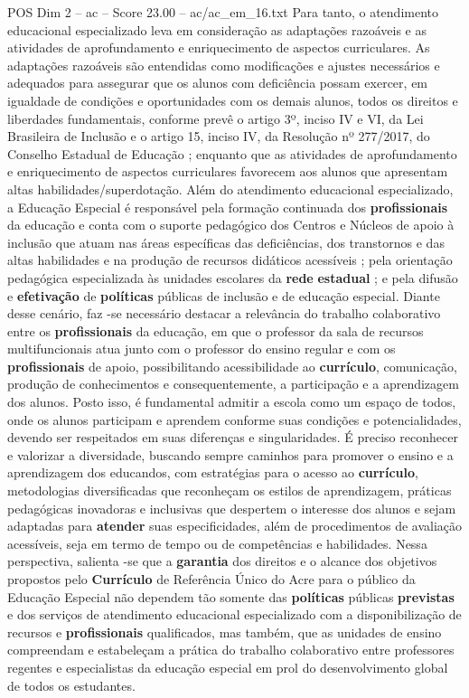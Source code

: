 \begin{textsample}{POS Dim 2 – ac – Score 23.00 – ac/ac\_em\_16.txt}
Para tanto, o atendimento educacional especializado leva em consideração as adaptações razoáveis e as atividades de aprofundamento e enriquecimento de aspectos curriculares.
As adaptações razoáveis são entendidas como modificações e ajustes necessários e adequados para assegurar que os alunos com deficiência possam exercer, em igualdade de condições e oportunidades com os demais alunos, todos os direitos e liberdades fundamentais, conforme prevê o artigo 3º, inciso IV e VI, da Lei Brasileira de Inclusão e o artigo 15, inciso IV, da Resolução nº 277/2017, do Conselho Estadual de Educação ; enquanto que as atividades de aprofundamento e enriquecimento de aspectos curriculares favorecem aos alunos que apresentam altas habilidades/superdotação.
Além do atendimento educacional especializado, a Educação Especial é responsável pela formação continuada dos \textbf{profissionais} da educação e conta com o suporte pedagógico dos Centros e Núcleos de apoio à inclusão que atuam nas áreas específicas das deficiências, dos transtornos e das altas habilidades e na produção de recursos didáticos acessíveis ; pela orientação pedagógica especializada às unidades escolares da \textbf{rede} \textbf{estadual} ; e pela difusão e \textbf{efetivação} de \textbf{políticas} públicas de inclusão e de educação especial.
Diante desse cenário, faz -se necessário destacar a relevância do trabalho colaborativo entre os \textbf{profissionais} da educação, em que o professor da sala de recursos multifuncionais atua junto com o professor do ensino regular e com os \textbf{profissionais} de apoio, possibilitando acessibilidade ao \textbf{currículo}, comunicação, produção de conhecimentos e consequentemente, a participação e a aprendizagem dos alunos.
Posto isso, é fundamental admitir a escola como um espaço de todos, onde os alunos participam e aprendem conforme suas condições e potencialidades, devendo ser respeitados em suas diferenças e singularidades.
É preciso reconhecer e valorizar a diversidade, buscando sempre caminhos para promover o ensino e a aprendizagem dos educandos, com estratégias para o acesso ao \textbf{currículo}, metodologias diversificadas que reconheçam os estilos de aprendizagem, práticas pedagógicas inovadoras e inclusivas que despertem o interesse dos alunos e sejam adaptadas para \textbf{atender} suas especificidades, além de procedimentos de avaliação acessíveis, seja em termo de tempo ou de competências e habilidades.
Nessa perspectiva, salienta -se que a \textbf{garantia} dos direitos e o alcance dos objetivos propostos pelo \textbf{Currículo} de Referência Único do Acre para o público da Educação Especial não dependem tão somente das \textbf{políticas} públicas \textbf{previstas} e dos serviços de atendimento educacional especializado com a disponibilização de recursos e \textbf{profissionais} qualificados, mas também, que as unidades de ensino compreendam e estabeleçam a prática do trabalho colaborativo entre professores regentes e especialistas da educação especial em prol do desenvolvimento global de todos os estudantes.

\end{textsample}
